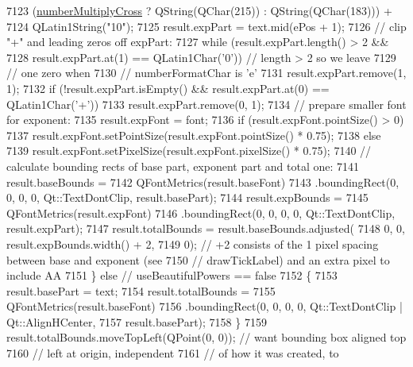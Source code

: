 \begin{DoxyCode}
7123           (\hyperlink{class_q_c_p_axis_painter_private_a0deb7524009140f00a774dfd286d002c}{numberMultiplyCross} ? QString(QChar(215)) : QString(QChar(183))) +
7124           QLatin1String(\textcolor{stringliteral}{"10"});
7125     result.expPart = text.mid(ePos + 1);
7126     \textcolor{comment}{// clip "+" and leading zeros off expPart:}
7127     \textcolor{keywordflow}{while} (result.expPart.length() > 2 &&
7128            result.expPart.at(1) == QLatin1Char(\textcolor{charliteral}{'0'})) \textcolor{comment}{// length > 2 so we leave}
7129                                                      \textcolor{comment}{// one zero when}
7130                                                      \textcolor{comment}{// numberFormatChar is 'e'}
7131       result.expPart.remove(1, 1);
7132     \textcolor{keywordflow}{if} (!result.expPart.isEmpty() && result.expPart.at(0) == QLatin1Char(\textcolor{charliteral}{'+'}))
7133       result.expPart.remove(0, 1);
7134     \textcolor{comment}{// prepare smaller font for exponent:}
7135     result.expFont = font;
7136     \textcolor{keywordflow}{if} (result.expFont.pointSize() > 0)
7137       result.expFont.setPointSize(result.expFont.pointSize() * 0.75);
7138     \textcolor{keywordflow}{else}
7139       result.expFont.setPixelSize(result.expFont.pixelSize() * 0.75);
7140     \textcolor{comment}{// calculate bounding rects of base part, exponent part and total one:}
7141     result.baseBounds =
7142         QFontMetrics(result.baseFont)
7143             .boundingRect(0, 0, 0, 0, Qt::TextDontClip, result.basePart);
7144     result.expBounds =
7145         QFontMetrics(result.expFont)
7146             .boundingRect(0, 0, 0, 0, Qt::TextDontClip, result.expPart);
7147     result.totalBounds = result.baseBounds.adjusted(
7148         0, 0, result.expBounds.width() + 2,
7149         0); \textcolor{comment}{// +2 consists of the 1 pixel spacing between base and exponent (see}
7150             \textcolor{comment}{// drawTickLabel) and an extra pixel to include AA}
7151   \} \textcolor{keywordflow}{else}    \textcolor{comment}{// useBeautifulPowers == false}
7152   \{
7153     result.basePart = text;
7154     result.totalBounds =
7155         QFontMetrics(result.baseFont)
7156             .boundingRect(0, 0, 0, 0, Qt::TextDontClip | Qt::AlignHCenter,
7157                           result.basePart);
7158   \}
7159   result.totalBounds.moveTopLeft(QPoint(0, 0)); \textcolor{comment}{// want bounding box aligned top}
7160                                                 \textcolor{comment}{// left at origin, independent}
7161                                                 \textcolor{comment}{// of how it was created, to}

\end{DoxyCode}
